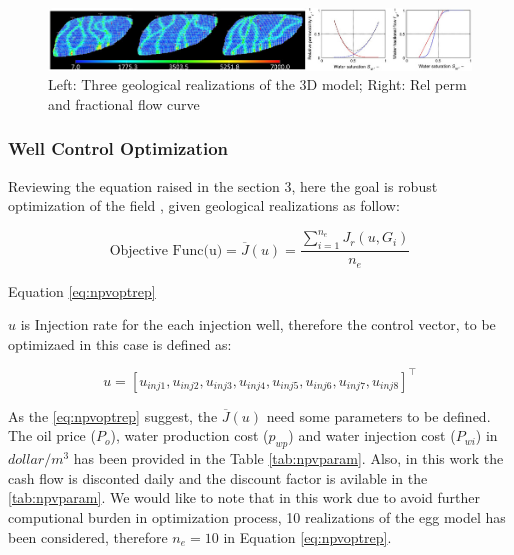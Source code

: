 \documentclass[]{elsarticle} %
\begin{document}
\begin{eqution}
\begin{figure}

{\centering \includegraphics[width=1\linewidth]{img/combine} 

}

\caption{Left: Three geological realizations of the 3D model; Right: Rel perm and fractional flow curve}\label{fig:combine}
\end{figure}

\hypertarget{well-control-optimization}{%
\subsubsection{Well Control Optimization}\label{well-control-optimization}}

Reviewing the equation raised in the section 3, here the goal is robust optimization of the field , given geological realizations as follow:

\begin{equation}
\text{Objective Func(u)}= \overline{J}(u) = \frac{\sum_{i=1}^{n_e} J_r(u,G_i)}{n_e}  \label{eq:npvoptrep}
\end{equation}

Equation \eqref{eq:npvoptrep}

\(u\) is Injection rate for the each injection well, therefore the control vector, to be optimizaed in this case is defined as:

\begin{equation}
u=[u_{inj1},u_{inj2},u_{inj3},u_{inj4},u_{inj5},u_{inj6},u_{inj7},u_{inj8}]^{\intercal} 
\label{eq:cont-vec}
\end{equation}

As the \eqref{eq:npvoptrep} suggest, the \(\overline{J}(u)\) need some parameters to be defined. The oil price (\(P_o\)), water production cost (\(p_{wp}\)) and water injection cost (\(P_{wi}\)) in \(dollar/m^3\) has been provided in the Table \ref{tab:npvparam}. Also, in this work the cash flow is disconted daily and the discount factor is avilable in the \ref{tab:npvparam}. We would like to note that in this work due to avoid further computional burden in optimization process, 10 realizations of the egg model has been considered, therefore \(n_e=10\) in Equation \eqref{eq:npvoptrep}.


\end{eqution}
\end{document}
